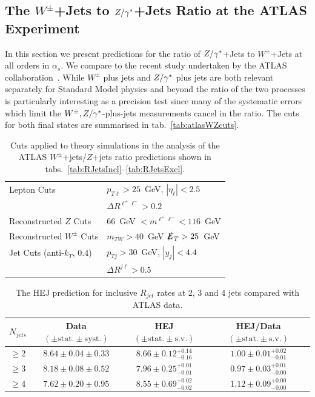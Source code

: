 	\subsection{The $W^\pm$+Jets to $Z/\gamma^*$+Jets Ratio at the ATLAS Experiment}
		\label{sub:ATLASWZsec}

		In this section we present predictions for the ratio of $Z/\gamma^*$+Jets to
		$W^\pm$+Jets at all orders in $\alpha_s$.  We compare to the recent study undertaken
		by the ATLAS collaboration~\cite{Aad:2014rta}.  While $W^\pm$ plus jets and $Z/\gamma^*$ plus
		jets are both relevant separately for Standard Model physics and beyond the ratio of
		the two processes is particularly interesting as a precision test since many of the
		systematic errors which limit the $W^\pm, Z/\gamma^*$-plus-jets measurements cancel in the
		ratio.  The cuts for both final states are summarised in tab.~\eqref{tab:atlasWZcuts}.

		\begin{table}[h]
		\centering
		\begin{tabular}{|l|l|}
			\hline
			Lepton Cuts & $p_{T\ell}>25$~GeV, \; $|\eta_\ell|<2.5$ \\
			&  $\Delta R^{\ell^+\ell^-} > 0.2$ \\ \hline
			Reconstructed $Z$ Cuts &  $66$~GeV $< m^{\ell^+\ell^-} <116$~GeV \\
			\hline
			Reconstructed $W^\pm$ Cuts & $m_{TW} > 40$~GeV\; $\slashed E_{T} > 25$~GeV \\ \hline
			Jet Cuts (anti-$k_T$, 0.4) & $p_{Tj}>30$~GeV, \; $|y_j|<4.4$ \\
			& $\Delta R^{j\ell} >0.5$ \\
			\hline
			\end{tabular}
			\caption{Cuts applied to theory simulations in the analysis of the ATLAS $W^\pm$+jets/$Z$+jets ratio
		  	predictions shown in tabs.~\eqref{tab:RJetsIncl}--\eqref{tab:RJetsExcl}.}
			\label{tab:atlasWZcuts}
		\end{table}

		\begin{table}[!h]
			\begin{center}
			\begin{tabular}{| c | c | c | c |}
		        \hline
			$N_{jets}$ & Data $(\pm \text{stat.}\pm \text{syst.})$ & HEJ $(\pm \text{stat.}\pm \text{s.v.})$ & HEJ/Data $(\pm \text{stat.}\pm \text{s.v.})$ \\ \hline
			$\ge2$ & $8.64\pm0.04\pm0.33$ & $8.66\pm0.12^{+0.14}_{-0.16}$ & $1.00\pm0.01^{+0.02}_{-0.01}$ \\ \hline
			$\ge3$ & $8.18\pm0.08\pm0.52$ & $7.96\pm0.25^{+0.01}_{-0.01}$ & $0.97\pm0.03^{+0.01}_{-0.00}$ \\ \hline
			$\ge4$ & $7.62\pm0.20\pm0.95$ & $8.55\pm0.69^{+0.02}_{-0.02}$ & $1.12\pm0.09^{+0.00}_{-0.00}$ \\ \hline
			\end{tabular}
			\caption{The HEJ prediction for inclusive $R_{jet}$ rates at 2, 3 and 4 jets compared with ATLAS data.}
			\label{tab:RJetsIncl}
			\end{center}
		\end{table}

